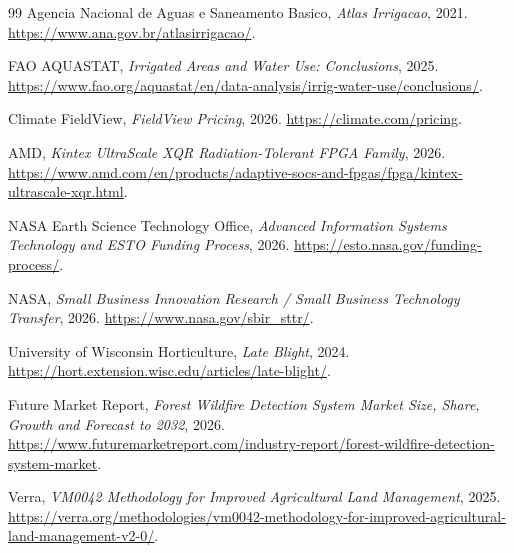 \documentclass[11pt,letterpaper]{article}
\begin{document}
\begin{thebibliography}{99}
Agencia Nacional de Aguas e Saneamento Basico,
\emph{Atlas Irrigacao},
2021.
\url{https://www.ana.gov.br/atlasirrigacao/}.

FAO AQUASTAT,
\emph{Irrigated Areas and Water Use: Conclusions},
2025.
\url{https://www.fao.org/aquastat/en/data-analysis/irrig-water-use/conclusions/}.

Climate FieldView,
\emph{FieldView Pricing},
2026.
\url{https://climate.com/pricing}.

AMD,
\emph{Kintex UltraScale XQR Radiation-Tolerant FPGA Family},
2026.
\url{https://www.amd.com/en/products/adaptive-socs-and-fpgas/fpga/kintex-ultrascale-xqr.html}.

NASA Earth Science Technology Office,
\emph{Advanced Information Systems Technology and ESTO Funding Process},
2026.
\url{https://esto.nasa.gov/funding-process/}.

NASA,
\emph{Small Business Innovation Research / Small Business Technology Transfer},
2026.
\url{https://www.nasa.gov/sbir_sttr/}.

University of Wisconsin Horticulture,
\emph{Late Blight},
2024.
\url{https://hort.extension.wisc.edu/articles/late-blight/}.

Future Market Report,
\emph{Forest Wildfire Detection System Market Size, Share, Growth and Forecast to 2032},
2026.
\url{https://www.futuremarketreport.com/industry-report/forest-wildfire-detection-system-market}.

Verra,
\emph{VM0042 Methodology for Improved Agricultural Land Management},
2025.
\url{https://verra.org/methodologies/vm0042-methodology-for-improved-agricultural-land-management-v2-0/}.

\end{thebibliography}
\end{document}
